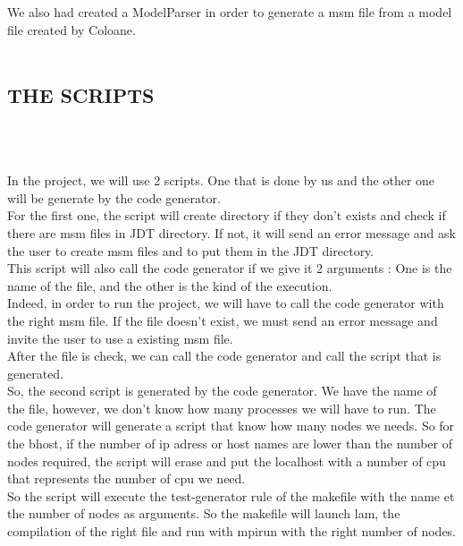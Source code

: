 \documentclass[a4paper,oneside,12pt]{article}
\begin{document}
   We also had created a ModelParser in order to generate a msm file from a model file created by Coloane.\\\\


\subsection{THE SCRIPTS}
\textbf{\\\\}

   In the project, we will use 2 scripts. One that is done by us and the other one will be generate by the code generator.\\
  
   For the first one, the script will create directory if they don't exists and  check if there are msm files in JDT directory. If not, it will send an error message and ask the user to create msm files and to put them in the JDT directory.\\
This script will also call the code generator if we give it 2 arguments : One is the name of the file, and the other is the kind of the execution.\\

Indeed, in order to run the project, we will have to call the code generator with the right msm file. If the file doesn't exist, we must send an error message and invite the user to use a existing msm file.\\

After the file is check, we can call the code generator and call the script that is generated.\\

   So, the second script is generated by the code generator. We have the name of the file, however, we don't know how many processes we will have to run. 
 The code generator will generate a script that know how many nodes we needs. So for the bhost, if the number of ip adress or host names are lower than the number of nodes required, the script will erase and put the localhost with a number of cpu that represents the number of cpu we need.\\

   So the script will execute the test-generator rule of the makefile with the name et the number of nodes as arguments. So the makefile will launch lam, the compilation of the right file and run with mpirun with the right number of nodes.\\\\
\end{document}
